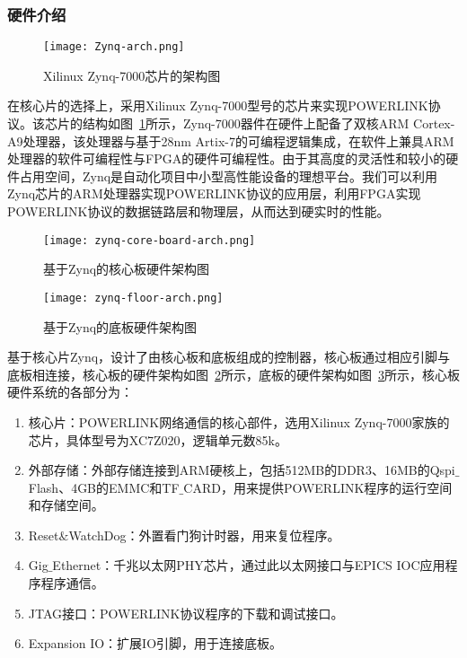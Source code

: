 \subsubsection{硬件介绍}

\begin{figure}[!htb]
  \centering
  \texttt{[image: Zynq-arch.png]}
  \caption{Xilinux Zynq-7000芯片的架构图}
  \label{fig:Zynq-arch}
\end{figure}

在核心片的选择上，采用Xilinux Zynq-7000型号的芯片来实现POWERLINK协议。该芯片的结构如图~\ref{fig:Zynq-arch}所示，Zynq-7000器件在硬件上配备了双核ARM Cortex-A9处理器，该处理器与基于28nm Artix-7的可编程逻辑集成，在软件上兼具ARM处理器的软件可编程性与FPGA的硬件可编程性。由于其高度的灵活性和较小的硬件占用空间，Zynq是自动化项目中小型高性能设备的理想平台。我们可以利用Zynq芯片的ARM处理器实现POWERLINK协议的应用层，利用FPGA实现POWERLINK协议的数据链路层和物理层，从而达到硬实时的性能。

\begin{figure}[!htb]
  \centering
  \texttt{[image: zynq-core-board-arch.png]}
  \caption{基于Zynq的核心板硬件架构图}
  \label{fig:zynq-core-board-arch}
\end{figure}

\begin{figure}[!htb]
  \centering
  \texttt{[image: zynq-floor-arch.png]}
  \caption{基于Zynq的底板硬件架构图}
  \label{fig:zynq-floor-arch}
\end{figure}

基于核心片Zynq，设计了由核心板和底板组成的控制器，核心板通过相应引脚与底板相连接，核心板的硬件架构如图~\ref{fig:zynq-core-board-arch}所示，底板的硬件架构如图~\ref{fig:zynq-floor-arch}所示，核心板硬件系统的各部分为：

\begin{enumerate}
  \item 核心片：POWERLINK网络通信的核心部件，选用Xilinux Zynq-7000家族的芯片，具体型号为XC7Z020，逻辑单元数85k。

  \item 外部存储：外部存储连接到ARM硬核上，包括512MB的DDR3、16MB的Qspi$\_$Flash、4GB的EMMC和TF$\_$CARD，用来提供POWERLINK程序的运行空间和存储空间。

  \item Reset$\&$WatchDog：外置看门狗计时器，用来复位程序。

  \item Gig$\_$Ethernet：千兆以太网PHY芯片，通过此以太网接口与EPICS IOC应用程序程序通信。

  \item JTAG接口：POWERLINK协议程序的下载和调试接口。
 
  \item Expansion IO：扩展IO引脚，用于连接底板。
\end{enumerate}

